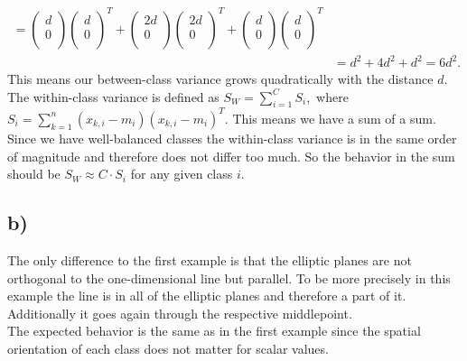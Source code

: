 \documentclass[paper=a4,fontsize=10pt,DIV11,BCOR10mm]{scrartcl}
\begin{document}
\begin{align*}
=
\begin{pmatrix} d \\0 \\ \end{pmatrix}\begin{pmatrix} d \\0 \\ \end{pmatrix}^T +
\begin{pmatrix} 2d \\0 \\ \end{pmatrix}\begin{pmatrix} 2d \\0 \\ \end{pmatrix}^T +
\begin{pmatrix} d \\0 \\ \end{pmatrix}\begin{pmatrix} d \\0 \\ \end{pmatrix}^T 
\\ 
&=
d^2 + 4d^2 + d^2 = 6d^2.
\end{align*} This means our between-class variance grows quadratically with the distance $d$.\\

The within-class variance is defined as \mbox{$S_W = \sum_{i=1}^C S_i$, where $S_i = \sum_{k=1}^n (x_{k,i} -m_i)(x_{k,i} - m_i)^T $}. This means we have a sum of a sum. Since we have well-balanced classes the within-class variance is in the same order of magnitude and therefore does not differ too much. So the behavior in the sum should be $S_W \approx C \cdot S_i$ for any given class $i$.

\subsection*{b)}
The only difference to the first example is that the elliptic planes are not orthogonal to the one-dimensional line but parallel. To be more precisely in this example the line is in all of the elliptic planes and therefore a part of it. Additionally it goes again through the respective middlepoint.\\

The expected behavior is the same as in the first example since the spatial orientation of each class does not matter for scalar values.
\end{document}
